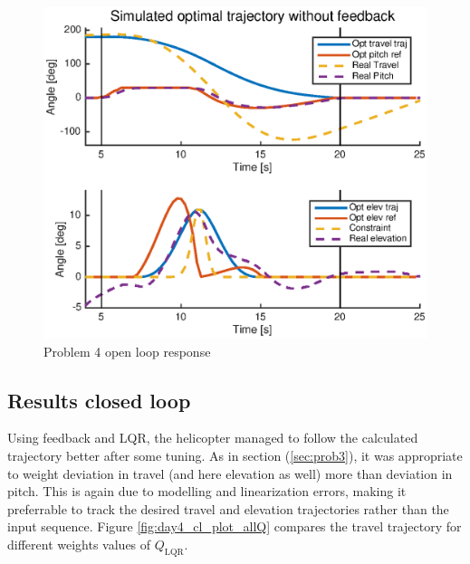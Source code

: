 
\begin{figure}[htb]
    \centering
     \includegraphics{figures/day4_ol/plot_day4_OL}
    \caption{Problem 4 open loop response}
    \label{fig:day4_ol}
\end{figure}

\subsection{Results closed loop}

Using feedback and LQR, the helicopter managed to follow the calculated trajectory better after some tuning. As in section (\ref{sec:prob3}), it was appropriate to weight deviation in travel (and here elevation as well) more than deviation in pitch. This is again due to modelling and linearization errors, making it preferrable to track the desired travel and elevation trajectories rather than the input sequence. Figure \ref{fig:day4_cl_plot_allQ} compares the travel trajectory for different weights values of $Q_{\text{LQR}}$.

